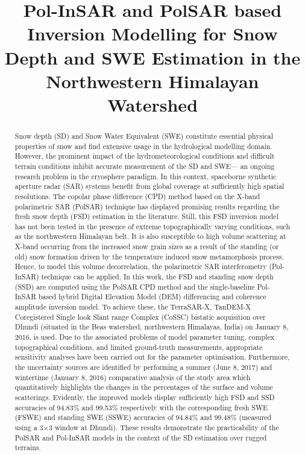 \documentclass[review]{elsarticle}
\numberwithin{equation}{section}
\numberwithin{figure}{section}
\numberwithin{table}{section}
\begin{document}
\begin{frontmatter}

\title{Pol-InSAR and PolSAR based Inversion Modelling for Snow Depth and SWE Estimation in the Northwestern Himalayan Watershed}


\begin{abstract}
Snow depth (SD) and Snow Water Equivalent (SWE) constitute essential physical properties of snow and find extensive usage in the hydrological modelling domain. However, the prominent impact of the hydrometeorological conditions and difficult terrain conditions inhibit accurate measurement of the SD and SWE--- an ongoing research problem in the cryosphere paradigm. In this context, spaceborne synthetic aperture radar (SAR) systems benefit from global coverage at sufficiently high spatial resolutions. The copolar phase difference (CPD) method based on the X-band polarimetric SAR (PolSAR) technique has displayed promising results regarding the fresh snow depth (FSD) estimation in the literature. Still, this FSD inversion model has not been tested in the presence of extreme topographically varying conditions, such as the northwestern Himalayan belt. It is also susceptible to high volume scattering at X-band occurring from the increased snow grain sizes as a result of the standing (or old) snow formation driven by the temperature induced snow metamorphosis process. Hence, to model this volume decorrelation, the polarimetric SAR interferometry (Pol-InSAR) technique can be applied. In this work, the FSD and standing snow depth (SSD) are computed using the PolSAR CPD method and the single-baseline Pol-InSAR based hybrid Digital Elevation Model (DEM) differencing and coherence amplitude inversion model. To achieve these, the TerraSAR-X, TanDEM-X Coregistered Single look Slant range Complex (CoSSC) bistatic acquisition over Dhundi (situated in the Beas watershed, northwestern Himalayas, India) on January 8, 2016, is used. Due to the associated problems of model parameter tuning, complex topographical conditions, and limited ground-truth measurements, appropriate sensitivity analyses have been carried out for the parameter optimisation. Furthermore, the uncertainty sources are identified by performing a summer (June 8, 2017) and wintertime (January 8, 2016) comparative analysis of the study area which quantitatively highlights the changes in the percentages of the surface and volume scatterings. Evidently, the improved models display sufficiently high FSD and SSD accuracies of 94.83\% and 99.53\% respectively with the corresponding fresh SWE (FSWE) and standing SWE (SSWE) accuracies of 94.84\% and 99.48\% (measured using a 3$\times$3 window at Dhundi). These results demonstrate the practicability of the PolSAR and Pol-InSAR models in the context of the SD estimation over rugged terrains.

\end{abstract}
\end{frontmatter}
\end{document}
